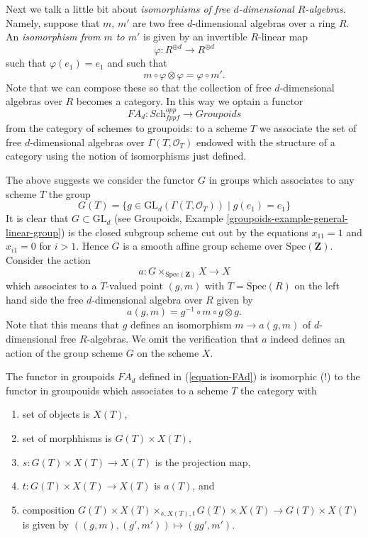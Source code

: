 \medskip\noindent
Next we talk a little bit about {\it isomorphisms of free $d$-dimensional
$R$-algebras}. Namely, suppose that $m$, $m'$ are two free $d$-dimensional
algebras over a ring $R$. An {\it isomorphism from $m$ to $m'$} is given by
an invertible $R$-linear map
$$
\varphi : R^{\oplus d} \longrightarrow R^{\oplus d}
$$
such that $\varphi(e_1) = e_1$ and such that
$$
m \circ \varphi \otimes \varphi = \varphi \circ m'.
$$
Note that we can compose these so that the collection of
free $d$-dimensional algebras over $R$ becomes a category.
In this way we optain a functor
\begin{equation}
\label{equation-FAd}
FA_d : \textit{Sch}_{fppf}^{opp} \longrightarrow \textit{Groupoids}
\end{equation}
from the category of schemes to groupoids: to a scheme $T$ we associate the
set of free $d$-dimensional algebras over $\Gamma(T, \mathcal{O}_T)$
endowed with the structure
of a category using the notion of isomorphisms just defined.

\medskip\noindent
The above suggests we consider the functor $G$ in groups
which associates to any scheme $T$ the group
$$
G(T) = \{g \in \text{GL}_d(\Gamma(T, \mathcal{O}_T)) \mid g(e_1) = e_1\}
$$
It is clear that $G \subset \text{GL}_d$ (see
Groupoids, Example \ref{groupoids-example-general-linear-group})
is the closed subgroup scheme cut out by the equations
$x_{11} = 1$ and $x_{i1} = 0$ for $i > 1$. Hence $G$ is a smooth
affine group scheme over $\text{Spec}(\mathbf{Z})$. Consider the
action
$$
a : G \times_{\text{Spec}(\mathbf{Z})} X \longrightarrow X
$$
which associates to a $T$-valued point $(g, m)$ with $T = \text{Spec}(R)$
on the left hand side the free $d$-dimensional algebra over $R$
given by
$$
a(g, m) = g^{-1} \circ m \circ g \otimes g.
$$
Note that this means that $g$ defines an isomorphism $m \to a(g, m)$
of $d$-dimensional free $R$-algebras. We omit the verification that
$a$ indeed defines an action of the group scheme $G$ on the scheme $X$.

\begin{lemma}
\label{lemma-represent-FAd}
The functor in groupoids $FA_d$ defined in (\ref{equation-FAd})
is isomorphic (!) to the functor in groupouids which associates
to a scheme $T$ the category with
\begin{enumerate}
\item set of objects is $X(T)$,
\item set of morphhisms is $G(T) \times X(T)$,
\item $s : G(T) \times X(T) \to X(T)$ is the projection map,
\item $t : G(T) \times X(T) \to X(T)$ is $a(T)$, and
\item composition $G(T) \times X(T) \times_{s, X(T), t} G(T) \times X(T)
\to G(T) \times X(T)$ is given by $((g, m), (g', m')) \mapsto (gg', m')$.
\end{enumerate}
\end{lemma}

